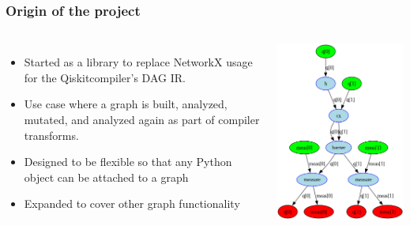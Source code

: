 \documentclass[aspectratio=169,11pt,hyperref={colorlinks=true}]{beamer}
\begin{document}
\begin{frame}
    \frametitle{Origin of the project}
    \begin{columns}
        \begin{itemize}
            \item Started as a library to replace NetworkX usage for the Qiskit\footnotemark compiler's DAG IR.
            \item Use case where a graph is built, analyzed, mutated, and analyzed again as part of compiler transforms.
            \item Designed to be flexible so that any Python object can be attached to a graph
            \item Expanded to cover other graph functionality
        \end{itemize}
        \includegraphics[height=.8\textheight]{dag.png}
    \end{columns}
\end{frame}
\end{document}
